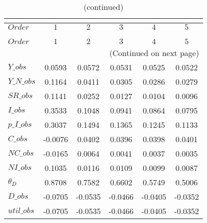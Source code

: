  
\begin{center}
\begin{longtable}{lccccc} 
\caption{COEFFICIENTS OF AUTOCORRELATION}\\
 \label{Table:th_autocorr_matrix}\\
\toprule 
$Order       $	 & 	 $          1$	 & 	 $          2$	 & 	 $          3$	 & 	 $          4$	 & 	 $          5$\\
\midrule \endfirsthead 
\caption{(continued)}\\
 \toprule \\ 
$Order       $	 & 	 $          1$	 & 	 $          2$	 & 	 $          3$	 & 	 $          4$	 & 	 $          5$\\
\midrule \endhead 
\midrule \multicolumn{6}{r}{(Continued on next page)} \\ \bottomrule \endfoot 
\bottomrule \endlastfoot 
$Y\_obs      $	 & 	     0.0593	 & 	     0.0572	 & 	     0.0531	 & 	     0.0525	 & 	     0.0522 \\ 
$Y\_N\_obs   $	 & 	     0.1164	 & 	     0.0411	 & 	     0.0305	 & 	     0.0286	 & 	     0.0279 \\ 
$SR\_obs     $	 & 	     0.1141	 & 	     0.0252	 & 	     0.0127	 & 	     0.0104	 & 	     0.0096 \\ 
$I\_obs      $	 & 	     0.3533	 & 	     0.1048	 & 	     0.0941	 & 	     0.0864	 & 	     0.0795 \\ 
$p\_I\_obs   $	 & 	     0.3037	 & 	     0.1494	 & 	     0.1365	 & 	     0.1245	 & 	     0.1133 \\ 
$C\_obs      $	 & 	    -0.0076	 & 	     0.0402	 & 	     0.0396	 & 	     0.0398	 & 	     0.0401 \\ 
$NC\_obs     $	 & 	    -0.0165	 & 	     0.0064	 & 	     0.0041	 & 	     0.0037	 & 	     0.0035 \\ 
$NI\_obs     $	 & 	     0.1035	 & 	     0.0116	 & 	     0.0109	 & 	     0.0099	 & 	     0.0087 \\ 
${\theta_D}  $	 & 	     0.8708	 & 	     0.7582	 & 	     0.6602	 & 	     0.5749	 & 	     0.5006 \\ 
$D\_obs      $	 & 	    -0.0705	 & 	    -0.0535	 & 	    -0.0466	 & 	    -0.0405	 & 	    -0.0352 \\ 
$util\_obs   $	 & 	    -0.0705	 & 	    -0.0535	 & 	    -0.0466	 & 	    -0.0405	 & 	    -0.0352 \\ 
\end{longtable}
 \end{center}
